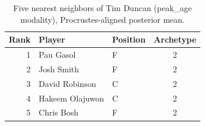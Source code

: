 \begin{table}[htbp]
  \centering\small
  \begin{tabular}{rllc}
    \toprule
    Rank & Player & Position & Archetype \\
    \midrule
    1 & Pau Gasol & F & 2 \\
    2 & Josh Smith & F & 2 \\
    3 & David Robinson & C & 2 \\
    4 & Hakeem Olajuwon & C & 2 \\
    5 & Chris Bosh & F & 2 \\
    \bottomrule
  \end{tabular}
  \caption{Five nearest neighbors of Tim Duncan (peak_age modality), Procrustes-aligned posterior mean.}
  \label{tab:Tim_Duncan_neighbors_peak_age}
\end{table}


